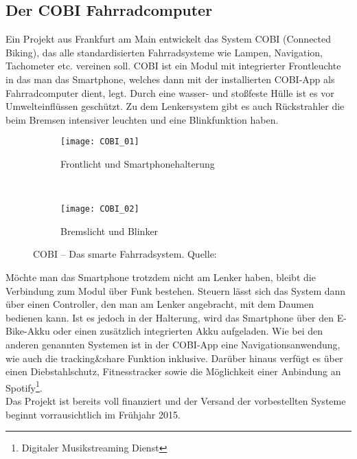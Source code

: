 \subsection{Der COBI Fahrradcomputer}
Ein Projekt aus Frankfurt am Main entwickelt das System \textsc{COBI} (Connected Biking), das alle standardisierten Fahrradsysteme wie Lampen, Navigation, Tachometer etc. vereinen soll. \textsc{COBI} ist ein Modul mit integrierter Frontleuchte in das man das \gls{Smartphone}, welches dann mit der installierten \textsc{COBI}-\Gls{App} als Fahrradcomputer dient, legt. Durch eine wasser- und stoßfeste Hülle ist es vor Umwelteinflüssen geschützt. Zu dem Lenkersystem gibt es auch Rückstrahler die beim Bremsen intensiver leuchten und eine Blinkfunktion haben.\\
\begin{figure}[H]
        \centering
        \begin{subfigure}[b]{0.49\textwidth}
                \texttt{[image: COBI\_01]}
                \caption{Frontlicht und Smartphonehalterung}
                \label{fig:cobi1}
        \end{subfigure}%
        ~ %
        \begin{subfigure}[b]{0.49\textwidth}
                \texttt{[image: COBI\_02]}
                \caption{Bremslicht und Blinker}
                \label{fig:cobi2}
        \end{subfigure}
        \grayRule
        \caption[COBI]{COBI -- Das smarte Fahrradsystem. Quelle: \cite{cobi_pic}}
        \label{fig:cobi}
\end{figure}
Möchte man das \gls{Smartphone} trotzdem nicht am Lenker haben, bleibt die Verbindung zum Modul über Funk bestehen. Steuern lässt sich das System dann über einen Controller, den man am Lenker angebracht, mit dem Daumen bedienen kann. Ist es jedoch in der Halterung, wird das \gls{Smartphone} über den E-Bike-Akku oder einen zusätzlich integrierten Akku aufgeladen. Wie bei den anderen genannten Systemen ist in der \textsc{COBI}-\Gls{App} eine Navigationsanwendung, wie auch die tracking\&share Funktion inklusive. Darüber hinaus verfügt es über einen Diebstahlschutz, Fitnesstracker sowie die Möglichkeit einer Anbindung an Spotify\footnote{ Digitaler Musikstreaming Dienst}.\\
Das Projekt ist bereits voll finanziert und der Versand der vorbestellten Systeme beginnt vorrausichtlich im Frühjahr 2015. \cite{cobi}
